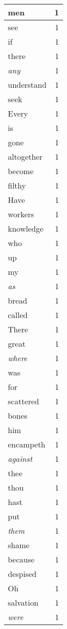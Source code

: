 \begin{center}
\begin{longtable}{l|r}
men & 1 \\ \hline
see & 1 \\ \hline
if & 1 \\ \hline
there & 1 \\ \hline
\emph{any} & 1 \\ \hline
understand & 1 \\ \hline
seek & 1 \\ \hline
Every & 1 \\ \hline
is & 1 \\ \hline
gone & 1 \\ \hline
altogether & 1 \\ \hline
become & 1 \\ \hline
filthy & 1 \\ \hline
Have & 1 \\ \hline
workers & 1 \\ \hline
knowledge & 1 \\ \hline
who & 1 \\ \hline
up & 1 \\ \hline
my & 1 \\ \hline
\emph{as} & 1 \\ \hline
bread & 1 \\ \hline
called & 1 \\ \hline
There & 1 \\ \hline
great & 1 \\ \hline
\emph{where} & 1 \\ \hline
was & 1 \\ \hline
for & 1 \\ \hline
scattered & 1 \\ \hline
bones & 1 \\ \hline
him & 1 \\ \hline
encampeth & 1 \\ \hline
\emph{against} & 1 \\ \hline
thee & 1 \\ \hline
thou & 1 \\ \hline
hast & 1 \\ \hline
put & 1 \\ \hline
\emph{them} & 1 \\ \hline
shame & 1 \\ \hline
because & 1 \\ \hline
despised & 1 \\ \hline
Oh & 1 \\ \hline
salvation & 1 \\ \hline
\emph{were} & 1 \\ \hline

\end{longtable}
\end{center}
